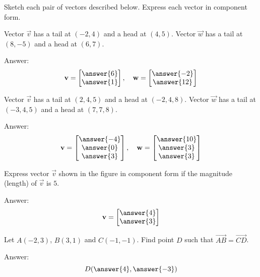 \documentclass{ximera}
\begin{document}
\begin{problem}\label{prob:componentform}
Sketch each pair of vectors described below.  Express each vector in component form. 
  \begin{problem}\label{prob:componentform1}
Vector $\vec{v}$ has a tail at $(-2,4)$ and a head at $(4,5)$. Vector $\vec{w}$ has a tail at $(8,-5)$ and a head at $(6,7)$.

Answer:
$$\vec{v}=\begin{bmatrix}\answer{6}\\ \answer{1}\end{bmatrix},\quad\vec{w}=\begin{bmatrix}\answer{-2}\\ \answer{12}\end{bmatrix}$$
\end{problem}

\begin{problem}\label{prob:componentform2}
 Vector $\vec{v}$ has a tail at $(2,4,5)$ and a head at $(-2,4,8)$. Vector $\vec{w}$ has a tail at $(-3,4,5)$ and a head at $(7,7,8)$.
 
 Answer:
 $$\vec{v}=\begin{bmatrix}\answer{-4}\\\answer{0}\\\answer{3}\end{bmatrix},\quad\vec{w}=\begin{bmatrix}\answer{10}\\\answer{3}\\\answer{3}\end{bmatrix}$$
 \end{problem}
  \end{problem}

\begin{problem}\label{prob:compformgivenlength}
Express vector $\vec{v}$ shown in the figure  in component form if the magnitude (length) of $\vec{v}$ is $5$.

\begin{center}
\end{center}

Answer:
$$\vec{v}=\begin{bmatrix}\answer{4}\\\answer{3}\end{bmatrix}$$
\end{problem}

\begin{problem}\label{prob:compformpractice} Let $A(-2, 3)$, $B(3, 1)$ and $C(-1, -1)$.  Find point $D$ such that $\overrightarrow{AB}=\overrightarrow{CD}$.

Answer:
$$D(\answer{4}, \answer{-3})$$
\end{problem}
\end{document}
